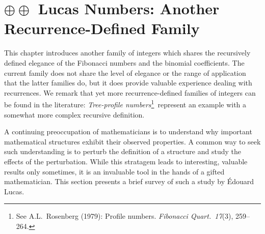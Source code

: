 
\chapter{$\oplus \oplus$ Lucas Numbers: Another Recurrence-Defined Family}
\label{ch:recurrent-numbers-appendix}
\label{sec:Lucas-numbers}


\noindent
This chapter introduces another family of integers which shares the recursively defined elegance of the Fibonacci numbers and the binomial coefficients.  The current family does not share the level of elegance or the range of application that the latter families do, but it does provide valuable experience dealing with recurrences.  We remark that yet more recurrence-defined families of integers can be found in the literature: {\em Tree-profile numbers}\footnote{See A.L.~Rosenberg (1979): Profile numbers.  {\it Fibonacci Quart.~17}(3), 259--264.}~represent an example with a somewhat more complex recursive definition.




A continuing preoccupation of mathematicians is to understand why
important mathematical structures exhibit their observed properties.
A common way to seek such understanding is to perturb the definition
of a structure and study the effects of the perturbation.  While this
stratagem leads to interesting, valuable results only sometimes, it is
an invaluable tool in the hands of a gifted mathematician.  This
section presents a brief survey of such a study by \'{E}douard Lucas.  
 

